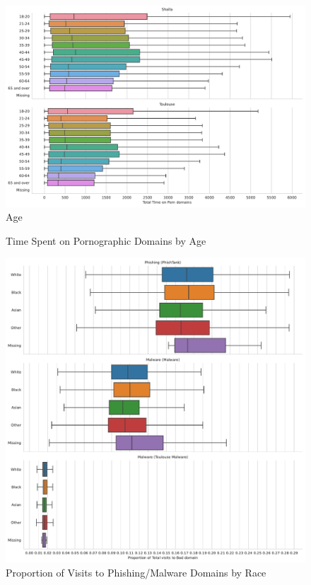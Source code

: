 \documentclass[12pt, letterpaper]{article}
\begin{document}
\begin{figure}[!htb]
  \centering
  \caption{Time Spent on Pornographic Domains by Age}
  \label{fig:total_time_porn_age}
  \includegraphics[width=\textwidth]{../figs/total_time_porn_age.pdf}\\Age
\end{figure}

\begin{figure}[!htb]
  \centering
  \caption{Proportion of Visits to Phishing/Malware Domains by Race}
	\label{fig:prop_total_visits_phishing_malware_race}
	\includegraphics[width=\textwidth]{../figs/prop_total_visits_phishing_malware_tl_race.pdf}
	\end{figure}
\end{document}
